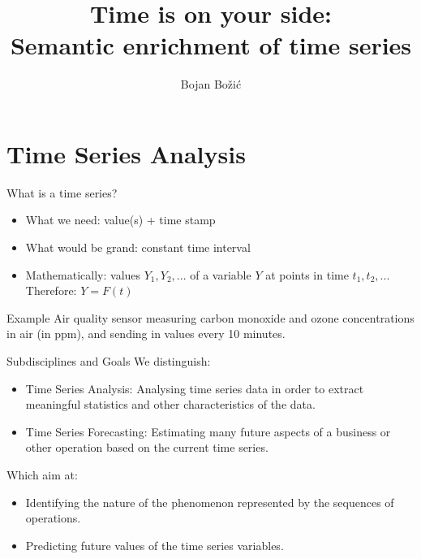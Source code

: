 \documentclass{beamer}
\title[Time is on your side]{Time is on your side: \\
Semantic enrichment of time series}
\author{Bojan Bo\v{z}i\'{c}}
\institute{Dublin Institute of Technology}
\date{}
\begin{document}
{
\begin{frame}
  \titlepage
\end{frame}}

\section{Time Series Analysis}

\begin{frame}{What is a time series?}
\begin{itemize}
  \item What we need: value(s) + time stamp
  \item What would be grand: constant time interval
  \item Mathematically: values $Y_1, Y_2, ...$ of a variable $Y$ at points in time $t_1, t_2, ...$ Therefore: $Y = F(t)$
\end{itemize}
\vskip 1cm
\begin{block}{Example}
Air quality sensor measuring carbon monoxide and ozone concentrations in air (in ppm), and sending in values every 10 minutes.
\end{block}
\end{frame}

\begin{frame}{Subdisciplines and Goals}
We distinguish:
\begin{itemize}
\item Time Series Analysis: Analysing time series data in order to extract meaningful statistics and other characteristics of the data.
\item Time Series Forecasting: Estimating many future aspects of a business or other operation based on the current time series.
\end{itemize}
Which aim at:
\begin{itemize}
\item Identifying the nature of the phenomenon represented by the sequences of operations.
\item Predicting future values of the time series variables.
\end{itemize}
\end{frame}
\end{document}

